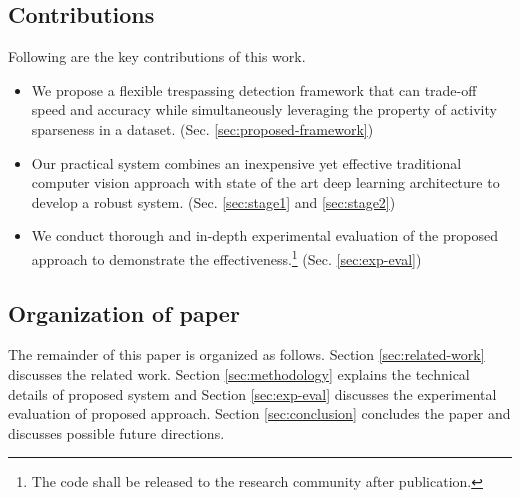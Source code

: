\subsection{Contributions}
Following are the key contributions of this work. 
\begin{itemize}
\item We propose a flexible trespassing detection framework that can trade-off speed and accuracy while simultaneously leveraging the property of activity sparseness in a dataset. (Sec. \ref{sec:proposed-framework})

\item Our practical system combines an inexpensive yet effective traditional computer vision approach with state of the art deep learning architecture to develop a robust system. (Sec. \ref{sec:stage1} and \ref{sec:stage2})

\item We conduct thorough and in-depth experimental evaluation of the proposed approach to demonstrate the effectiveness.\footnote{The code shall be released to the research community after publication.} (Sec. \ref{sec:exp-eval})
\end{itemize}
\subsection{Organization of paper}
The remainder of this paper is organized as follows.  Section \ref{sec:related-work} discusses the related work. Section \ref{sec:methodology} explains the technical details of proposed system and Section \ref{sec:exp-eval} discusses the experimental evaluation of proposed approach. Section \ref{sec:conclusion} concludes the paper and discusses possible future directions. 